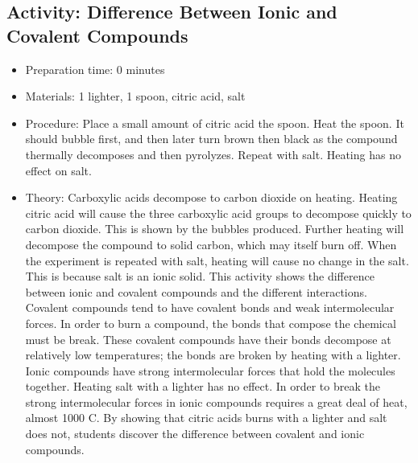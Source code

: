 \begin{itemize}
{\begin{itemize}
\begin{itemize}
{\subsection{Activity: Difference Between Ionic and Covalent Compounds}
\begin{itemize}
\item{Preparation time: 0 minutes}
\item{Materials: 1 lighter, 1 spoon, citric acid, salt}
\item{Procedure: Place a small amount of citric acid the spoon. Heat the spoon. It should bubble first, and then later turn brown then black as the compound thermally decomposes and then pyrolyzes. Repeat with salt. Heating has no effect on salt.}
\item{Theory: Carboxylic acids decompose to carbon dioxide on heating. Heating citric acid will cause the three carboxylic acid groups to decompose quickly to carbon dioxide. This is shown by the bubbles produced. Further heating will decompose the compound to solid carbon, which may itself burn off. When the experiment is repeated with salt, heating will cause no change in the salt. This is because salt is an ionic solid. This activity shows the difference between ionic and covalent compounds and the different interactions. Covalent compounds tend to have covalent bonds and weak intermolecular forces. In order to burn a compound, the bonds that compose the chemical must be break. These covalent compounds have their bonds decompose at relatively low temperatures; the bonds are broken by heating with a lighter. Ionic compounds have strong intermolecular forces that hold the molecules together. Heating salt with a lighter has no effect. In order to break the strong intermolecular forces in ionic compounds requires a great deal of heat, almost 1000 C. By showing that citric acids burns with a lighter and salt does not, students discover the difference between covalent and ionic compounds.}
\end{itemize}

}
\end{itemize}
\end{itemize}}
\end{itemize}

